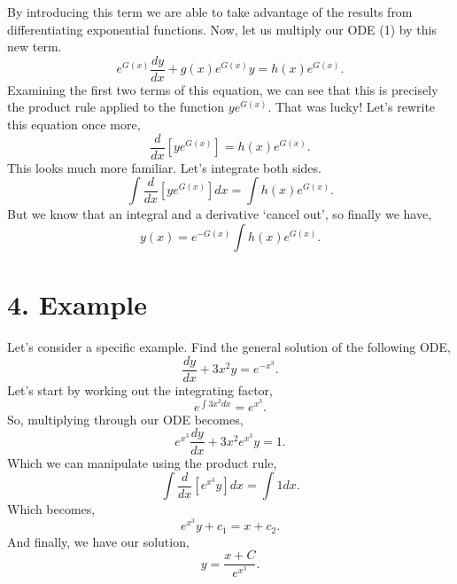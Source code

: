 \documentclass[11pt]{article}
\begin{document}
By introducing this term we are able to take advantage of the results from differentiating exponential functions. Now, let us multiply our ODE (1) by this new term.
\begin{equation}
    e^{G(x)} \frac{dy}{dx} + g(x) e^{G(x)} y = h(x) e^{G(x)}.
\end{equation}
Examining the first two terms of this equation, we can see that this is precisely the product rule applied to the function $ye^{G(x)}$. That was lucky!
Let's rewrite this equation once more,
\begin{equation}
    \frac{d}{dx} \left[ ye^{G(x)} \right] = h(x)e^{G(x)}.
\end{equation}
This looks much more familiar. Let's integrate both sides.
\begin{equation}
    \int \frac{d}{dx} \left[ ye^{G(x)} \right] dx = \int h(x)e^{G(x)}.
\end{equation}
But we know that an integral and a derivative `cancel out', so finally we have,
\begin{equation}
    y(x) = e^{-G(x)} \int h(x)e^{G(x)}.
\end{equation}

\section*{4. Example}
Let's consider a specific example. Find the general solution of the following ODE,
\begin{equation}
    \frac{dy}{dx} + 3x^2 y = e^{-x^3}.
\end{equation}
Let's start by working out the integrating factor,
\begin{equation}
    e^{\int 3x^2 dx} = e^{x^3}.
\end{equation}
So, multiplying through our ODE becomes,
\begin{equation}
    e^{x^3} \frac{dy}{dx} + 3x^2 e^{x^3} y = 1.
\end{equation}
Which we can manipulate using the product rule,
\begin{equation}
    \int \frac{d}{dx} \left[ e^{x^3} y \right] dx = \int 1 dx.
\end{equation}
Which becomes,
\begin{equation}
    e^{x^3} y + c_1 = x + c_2.
\end{equation}
And finally, we have our solution,
\begin{equation}
    y = \frac{x + C}{e^{x^3}}.
\end{equation}
    
\end{document}
